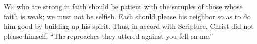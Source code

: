 
\lettrine{W}{e} who are strong in faith should be patient with the scruples of those whose faith is weak; we must not be selfish. Each should please his neighbor so as to do him good by building up his spirit. Thus, in accord with Scripture, Christ did not please himself: “The reproaches they uttered against you fell on me.”